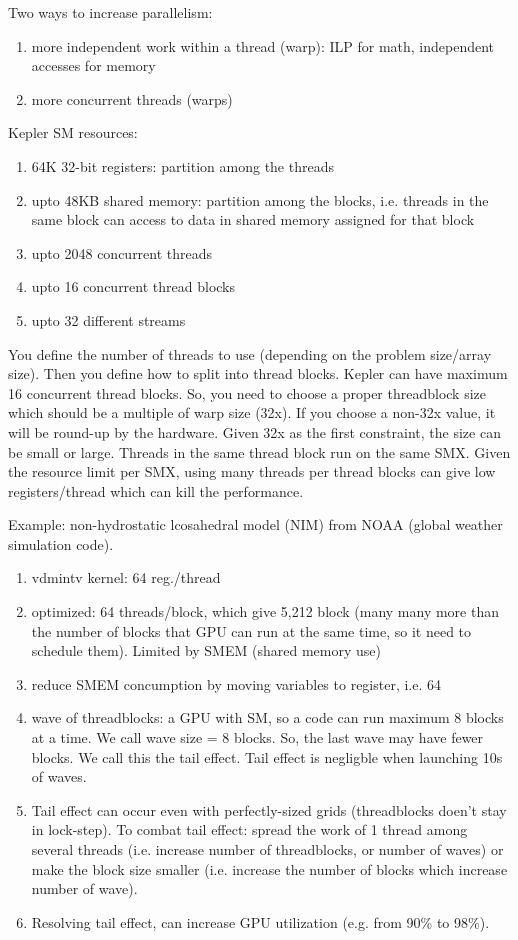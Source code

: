 Two ways to increase parallelism:
\begin{enumerate}
  \item more independent work within a thread (warp): ILP for math, independent
  accesses for memory
  \item more concurrent threads (warps)
\end{enumerate}

Kepler SM resources:
\begin{enumerate}
  \item 64K 32-bit registers: partition among the threads
  \item upto 48KB shared memory: partition among the blocks, i.e. threads in the
  same block can access to data in shared memory assigned for that block
  \item upto 2048 concurrent threads
  \item upto 16 concurrent thread blocks
  \item upto 32 different streams 
\end{enumerate}

You define the number of threads to use (depending on the problem size/array
size). Then you define how to split into thread blocks. Kepler can have maximum
16 concurrent thread blocks. So, you need to choose a proper threadblock size
which should be a multiple of warp size (32x). If you choose a non-32x value, it
will be round-up by the hardware. Given 32x as the first constraint, the size
can be small or large. Threads in the same thread block run on the same
SMX. Given the resource limit per SMX, using many threads per thread blocks can
give low registers/thread which can kill the performance. 

Example: non-hydrostatic lcosahedral model (NIM) from NOAA (global weather
simulation code).
\begin{enumerate}
  \item vdmintv kernel: 64 reg./thread
  \item optimized: 64 threads/block, which give 5,212 block (many many more
  than the number of blocks that GPU can run at the same time, so it need to
  schedule them).
  Limited by SMEM (shared memory use)
  \item reduce SMEM concumption by moving variables to register, i.e. 64
  \item wave of threadblocks: a GPU with SM, so a code can run maximum 8 blocks
  at a time. We call wave size = 8 blocks. So, the last wave may have fewer
  blocks. We call this the tail effect. Tail effect is negligble when launching
  10s of waves.
  \item Tail effect can occur even with perfectly-sized grids (threadblocks
  doen't stay in lock-step). To combat tail effect: spread the work of 1 thread
  among several threads (i.e. increase number of threadblocks, or number of
  waves) or make the block size smaller (i.e. increase the number of blocks
  which increase number of wave). 
  \item Resolving tail effect, can increase GPU utilization (e.g. from 90\% to
  98\%). 
\end{enumerate}

